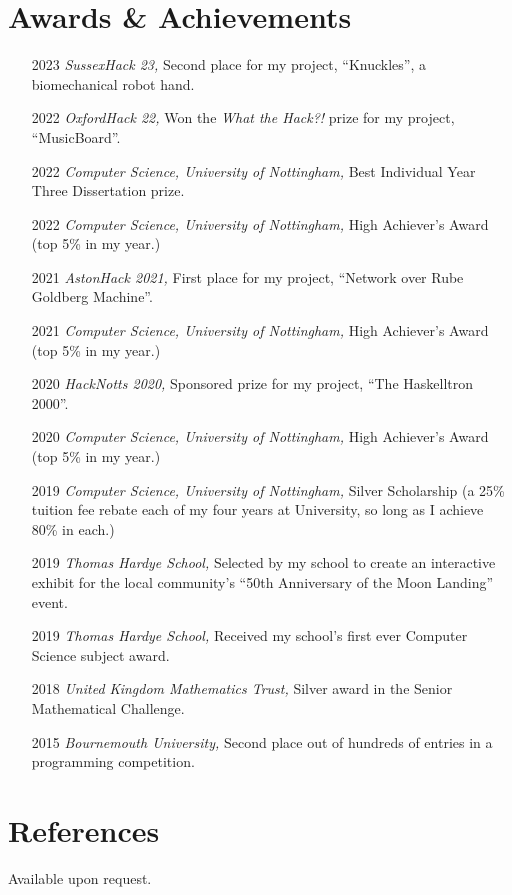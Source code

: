 \documentclass[12pt]{article}
\begin{document}
\section*{Awards \& Achievements}
\begin{itemize}
	\item[2023] \textit{SussexHack 23,} Second place for my project, ``Knuckles'', a biomechanical robot hand.
	\item[2022] \textit{OxfordHack 22,} Won the \textit{What the Hack?!} prize for my project, ``MusicBoard''.
	\item[2022] \textit{Computer Science, University of Nottingham,} Best Individual Year Three Dissertation prize.
	\item[2022] \textit{Computer Science, University of Nottingham,} High Achiever's Award (top 5\% in my year.)
	\item[2021] \textit{AstonHack 2021,} First place for my project, ``Network over Rube Goldberg Machine''.
	\item[2021] \textit{Computer Science, University of Nottingham,} High Achiever's Award (top 5\% in my year.)
	\item[2020] \textit{HackNotts 2020,} Sponsored prize for my project, ``The Haskelltron 2000''.
	\item[2020] \textit{Computer Science, University of Nottingham,} High Achiever's Award (top 5\% in my year.)
	\item[2019] \textit{Computer Science, University of Nottingham,} Silver Scholarship (a 25\% tuition fee rebate each of my four years at University, so long as I achieve 80\% in each.)
	\item[2019] \textit{Thomas Hardye School,} Selected by my school to create an interactive exhibit for the local community's ``50th Anniversary of the Moon Landing'' event.
	\item[2019] \textit{Thomas Hardye School,} Received my school's first ever Computer Science subject award.
	\item[2018] \textit{United Kingdom Mathematics Trust,} Silver award in the Senior Mathematical Challenge.
	\item[2015] \textit{Bournemouth University,} Second place out of hundreds of entries in a programming competition.
\end{itemize}

\section*{References}
Available upon request.

\vfill
\end{document}
